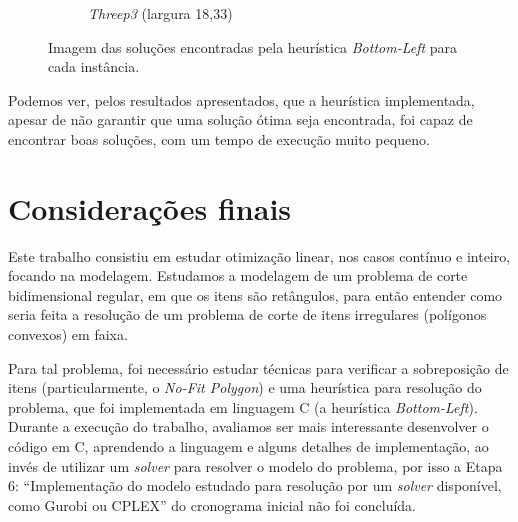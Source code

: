 \documentclass{article}
\begin{document}
\begin{figure}[!h]
\begin{subfigure}{.98\textwidth}
        \caption{{\it Threep3} (largura 18,33)}
        \label{fig:f5f}
    \end{subfigure}
    \caption{Imagem das soluções encontradas pela heurística {\it Bottom-Left} para cada instância.}
    \label{fig:f5}
\end{figure}

Podemos ver, pelos resultados apresentados, que a heurística implementada, apesar de não garantir que uma solução ótima seja encontrada, foi capaz de encontrar boas soluções, com um tempo de execução muito pequeno.

\section{Considerações finais} \label{sec:final}

Este trabalho consistiu em estudar otimização linear, nos casos contínuo e inteiro, focando na modelagem. Estudamos a modelagem de um problema de corte bidimensional regular, em que os itens são retângulos, para então entender como seria feita a resolução de um problema de corte de itens irregulares (polígonos convexos) em faixa. 

Para tal problema, foi necessário estudar técnicas para verificar a sobreposição de itens (particularmente, o {\it No-Fit Polygon}) e uma heurística para resolução do problema, que foi implementada em linguagem C (a heurística {\it Bottom-Left}). Durante a execução do trabalho, avaliamos ser mais interessante desenvolver o código em C, aprendendo a linguagem e alguns detalhes de implementação, ao invés de utilizar um {\it solver} para resolver o modelo do problema, por isso a Etapa 6: ``Implementação do modelo estudado para resolução por um {\it solver} disponível, como Gurobi ou CPLEX'' do cronograma inicial não foi concluída.
\end{document}
